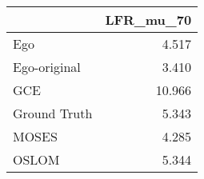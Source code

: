 \begin{tabular}{lr}
\toprule
{} & LFR_mu_70 \\
\midrule
Ego          &     4.517 \\
Ego-original &     3.410 \\
GCE          &    10.966 \\
Ground Truth &     5.343 \\
MOSES        &     4.285 \\
OSLOM        &     5.344 \\
\bottomrule
\end{tabular}
